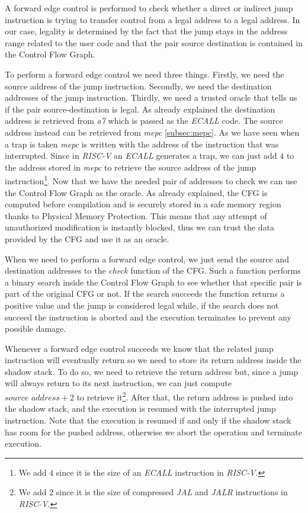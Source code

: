 A forward edge control is performed to check whether a direct or indirect jump
instruction is trying to transfer control from a legal address to a legal
address. In our case, legality is determined by the fact that the jump stays in
the address range related to the user code and that the pair source destination
is contained in the Control Flow Graph.

To perform a forward edge control we need three things. Firstly, we need the
source address of the jump instruction. Secondly, we need the destination
addresses of the jump instruction. Thirdly, we need a trusted oracle that tells
us if the pair source-destination is legal. As already explained the destination
address is retrieved from \textit{a7} which is passed as the \textit{ECALL} code.
The source address instead can be retrieved from \textit{mepc} \ref{subsec:mepc}.
As we have seen when a trap is taken \textit{mepc} is written with the address of
the instruction that was interrupted. Since in \textit{RISC-V} an \textit{ECALL}
generates a trap, we can just add $4$ to the address stored in \textit{mepc} to
retrieve the source address of the jump instruction\footnote{We add $4$ since it
is the size of an \textit{ECALL} instruction in \textit{RISC-V}.}. Now that we
have the needed pair of addresses to check we can use the Control Flow Graph as
the oracle. As already explained, the CFG is computed before compilation and is
securely stored in a safe memory region thanks to Physical Memory Protection. This
means that any attempt of unauthorized modification is instantly blocked, thus
we can trust the data provided by the CFG and use it as an oracle.

When we need to perform a forward edge control, we just send the source and destination
addresses to the \textit{check} function of the CFG. Such a function performs a binary
search inside the Control Flow Graph to see whether that specific pair is part of
the original CFG or not. If the search succeeds the function returns a positive
value and the jump is considered legal while, if the search does not succeed the
instruction is aborted and the execution terminates to prevent any possible damage.

Whenever a forward edge control succeeds we know that the related jump instruction
will eventually return so we need to store its return address inside the shadow stack.
To do so, we need to retrieve the return address but, since a jump will always
return to its next instruction, we can just compute $\textit{source address}+ 2$
to retrieve it\footnote{We add $2$ since it is the size of compressed \textit{JAL}
and \textit{JALR} instructions in \textit{RISC-V}.}. After that, the return
address is pushed into the shadow stack, and the execution is resumed with the interrupted
jump instruction. Note that the execution is resumed if and only if the shadow
stack has room for the pushed address, otherwise we abort the operation and terminate
execution.

